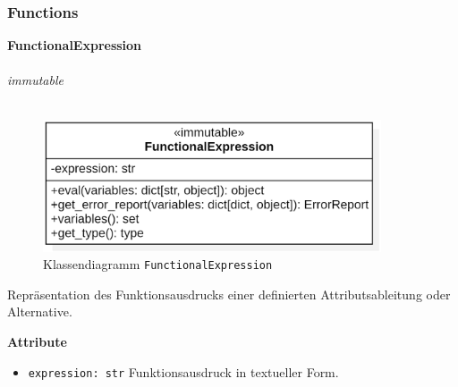 \documentclass{article}
\begin{document}
\newpage
\subsubsection{Functions}
\textbf{\large{FunctionalExpression}}\\\\
\textit{\flqq{}immutable\frqq}\normalsize\\\\
\begin{figure}[H]%
    \centering
    \includegraphics[width=10cm]{entwurf/Entwurf_dokument/img/cls/model/FunctionalExpression.png}
    \caption{Klassendiagramm \texttt{FunctionalExpression}}
\end{figure}

Repräsentation des Funktionsausdrucks einer definierten Attributsableitung oder Alternative.
\newline \newline

\textbf{{Attribute}}
\begin{itemize}
\item \texttt{expression: str} \newline Funktionsausdruck in textueller Form.
\\\\
\end{itemize}
\end{document}
